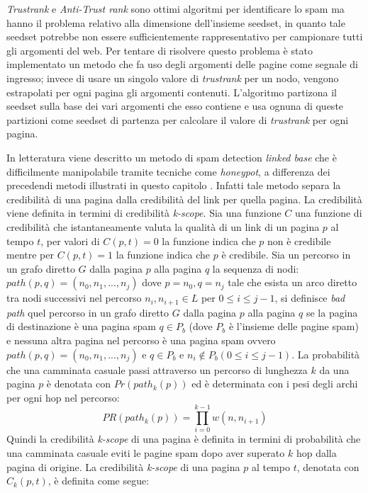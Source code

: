 \textit{Trustrank} e \textit{Anti-Trust rank} sono ottimi algoritmi per identificare lo spam ma hanno il problema relativo alla dimensione dell’insieme  seedset, in quanto tale seedset potrebbe non essere sufficientemente rappresentativo per campionare tutti gli argomenti del web. Per tentare di risolvere questo problema è stato implementato un metodo \cite{Wu:2006:TTU:1135777.1135792}  che fa uso degli argomenti delle pagine come segnale di ingresso;  invece di usare un singolo valore di \textit{trustrank} per un nodo, vengono estrapolati per ogni pagina gli argomenti contenuti. L'algoritmo partizona il seedset sulla base dei vari argomenti che esso contiene e usa ognuna di queste partizioni come seedset di partenza per calcolare il valore di \textit{trustrank} per ogni pagina.

 In letteratura viene descritto un metodo di spam detection  \cite{Caverlee:2007:CWS:1281100.1281124} \textit{linked base} che è difficilmente manipolabile tramite tecniche come \textit{honeypot}, a differenza dei precedendi metodi illustrati in questo capitolo . Infatti tale metodo separa la credibilità di una pagina dalla credibilità del link per quella pagina. La credibilità viene definita in termini di credibilità \textit{k-scope}. Sia una funzione \(C\) una funzione di credibilità che istantaneamente valuta la qualità di un link di un pagina \(p\) al tempo \(t\), per valori di \(C(p,t)=0\) la funzione indica che \(p\) non è credibile mentre per  \(C(p,t)=1\) la funzione indica che \(p\) è credibile. Sia un percorso in un grafo diretto \(G\) dalla pagina \(p\) alla pagina \(q\) la sequenza di nodi: \(path(p,q)=(n_0,n_1,...,n_j)\) dove \(p=n_0, q=n_j\) tale che esista un arco diretto tra nodi successivi nel percorso \(n_i,n_{i+1}\in L\) per \(0\leq i \leq j-1\), si definisce \textit{bad path} quel 
percorso  in un grafo  diretto \(G\)  dalla pagina \(p\) alla pagina \(q\) se la pagina di destinazione è una pagina spam \(q\in P_b\) (dove \(P_b\) è l'insieme delle pagine spam) e nessuna altra pagina nel percorso è una pagina spam ovvero \(path(p,q)=(n_0,n_1,...,n_j)\) e \(q\in P_b\) e \(n_i\not\in P_b (0\leq i\leq j-1)\). La probabilità che una camminata casuale passi attraverso un percorso di lunghezza \(k\) da una pagina \(p\) è denotata con \(Pr(path_k(p))\) ed è determinata con i pesi degli archi per ogni hop nel percorso:
\begin{equation}
 PR(path_k(p))=\prod_{i=0}^{k-1}w(n,n_{i+1})
\end{equation}
Quindi la credibilità \textit{k-scope} di una pagina  è definita in termini di probabilità che una camminata casuale eviti le pagine spam dopo aver superato \(k\) hop dalla pagina di origine. La credibilità \textit{k-scope} di una pagina \(p\) al tempo \(t\), denotata con \(C_k(p,t)\), è definita come segue:
